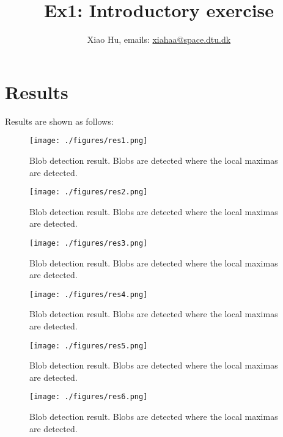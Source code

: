 \documentclass[a4paper]{article}
\title{Ex1: Introductory exercise}
\author{Xiao Hu, emails: \url{xiahaa@space.dtu.dk}}
\begin{document}
	\maketitle
	\thispagestyle{empty}
	\section{Results}
	Results are shown as follows:
		\begin{figure}[htbp]
	\centering
	\texttt{[image: ./figures/res1.png]}
	\caption{Blob detection result. Blobs are detected where the local maximas are detected.}
\end{figure}

\begin{figure}[htbp]
	\centering
	\texttt{[image: ./figures/res2.png]}
	\caption{Blob detection result. Blobs are detected where the local maximas are detected.}
\end{figure}
\begin{figure}[htbp]
	\centering
	\texttt{[image: ./figures/res3.png]}
	\caption{Blob detection result. Blobs are detected where the local maximas are detected.}
\end{figure}
\begin{figure}[htbp]
	\centering
	\texttt{[image: ./figures/res4.png]}
	\caption{Blob detection result. Blobs are detected where the local maximas are detected.}
\end{figure}
\begin{figure}[htbp]
	\centering
	\texttt{[image: ./figures/res5.png]}
	\caption{Blob detection result. Blobs are detected where the local maximas are detected.}
\end{figure}
\begin{figure}[htbp]
	\centering
	\texttt{[image: ./figures/res6.png]}
	\caption{Blob detection result. Blobs are detected where the local maximas are detected.}
\end{figure}
\end{document}
